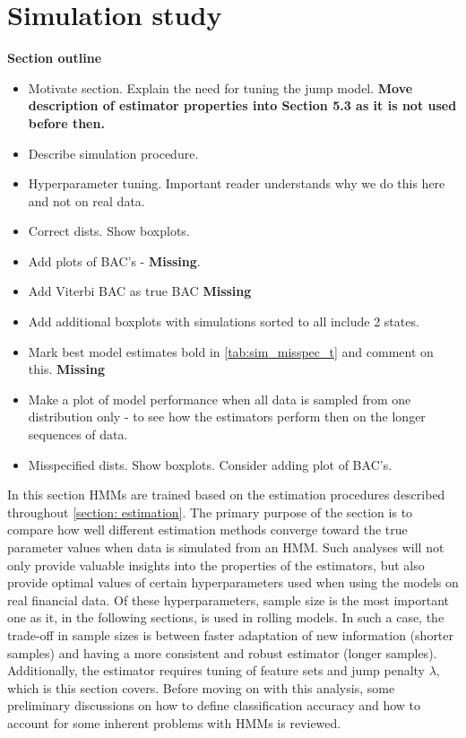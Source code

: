 \newpage

\section{Simulation study}

\textbf{Section outline}
\begin{itemize}
    \item Motivate section. Explain the need for tuning the jump model. \textbf{Move description of estimator properties into Section 5.3 as it is not used before then.}
    \item Describe simulation procedure.
    \item Hyperparameter tuning. Important reader understands why we do this here and not on real data.
    \item Correct dists. Show boxplots. 
    \item Add plots of BAC's - \textbf{Missing}.
    \item Add Viterbi BAC as true BAC \textbf{Missing}
    \item Add additional boxplots with simulations sorted to all include 2 states.
    \item Mark best model estimates bold in \cref{tab:sim_misspec_t} and comment on this. \textbf{Missing}
    \item Make a plot of model performance when all data is sampled from one distribution only - to see how the estimators perform then on the longer sequences of data.
    \item Misspecified dists. Show boxplots. Consider adding plot of BAC's.
\end{itemize}

In this section HMMs are trained based on the estimation procedures described throughout \cref{section: estimation}. The primary purpose of the section is to compare how well different estimation methods converge toward the true parameter values when data is simulated from an HMM. Such analyses will not only provide valuable insights into the properties of the estimators, but also provide optimal values of certain hyperparameters used when using the models on real financial data. Of these hyperparameters, sample size is the most important one as it, in the following sections, is used in rolling models. In such a case, the trade-off in sample sizes is between faster adaptation of new information (shorter samples) and having a more consistent and robust estimator (longer samples). Additionally, the \jump estimator requires tuning of feature sets and jump penalty $\lambda$, which is this section covers. Before moving on with this analysis, some preliminary discussions on how to define classification accuracy and how to account for some inherent problems with HMMs is reviewed.

